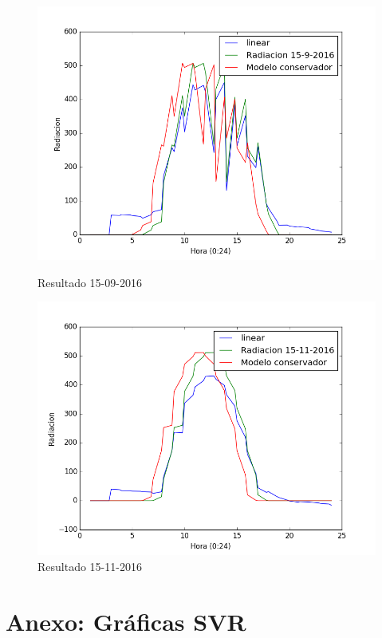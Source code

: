 \begin{figure}[htb]
		\includegraphics[width=\linewidth]{figures/linear_2016091520160915.png}
		\caption{Resultado 15-09-2016 \label{resultado_linear_5}}
\endminipage\hfill
{}
		\includegraphics[width=\linewidth]{figures/linear_2016111520161115.png}
		\caption{Resultado 15-11-2016 \label{resultado_linear_6}}
\endminipage\hfill
\end{figure}

\chapter{Anexo: Gráficas SVR}
\label{Appendix:Key2}

